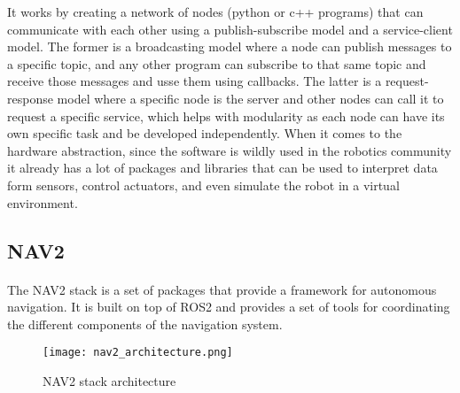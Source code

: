 It works by creating a network of nodes (python or c++ programs) that can communicate with each other 
using a publish-subscribe model and a service-client model. The former is a broadcasting 
model where a node can publish messages to a specific topic, and any other 
program can subscribe to that same topic and receive those messages and usse them using callbacks. 
The latter is a request-response model where a specific node is the server and other 
nodes can call it to request a specific service, which helps with modularity 
as each node can have its own specific task and be developed independently. When it comes to 
the hardware abstraction, since the software is wildly used in the robotics community 
it already has a lot of packages and libraries that can be used to interpret data form 
sensors, control actuators, and even simulate the robot in a virtual environment.


\subsection{NAV2}
\label{subsec:navigation2}
\paragraph{}The \gls{NAV2} stack is a set of packages that provide a framework for autonomous navigation. 
It is built on top of \gls{ROS2} and provides a set of tools for coordinating the different components of 
the navigation system.
\begin{figure}[h]
    \centering
    \texttt{[image: nav2\_architecture.png]}
    \caption{NAV2 stack architecture \cite{nav2_architecture}}
    \label{fig:nav2_stack}
\end{figure}

